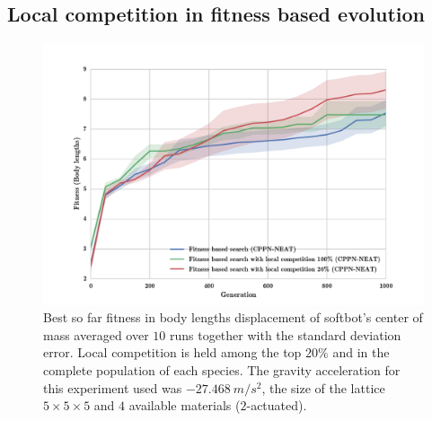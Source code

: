 











\clearpage
\subsection{Local competition in fitness based evolution}

\begin{figure}[h!]
\centering
\includegraphics[width=1.0\textwidth]{Figures/Results/fitComp100_20percent.pdf}
\caption{Best so far fitness in body lengths displacement of softbot's center of mass averaged over $10$ runs together with the standard deviation error. Local competition is held among the top $20\%$ and in the complete population of each species. The gravity acceleration for this experiment used was $-27.468\   m/s^2$, the size of the lattice $5\times 5\times5$ and $4$ available materials ($2$-actuated).}
\label{fig:fitComp100_20percent}
\end{figure}

